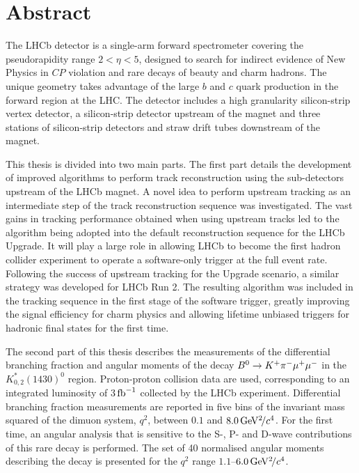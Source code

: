 \section*{Abstract}

The LHCb detector is a single-arm forward spectrometer covering the pseudorapidity range $2 < \eta < 5$, designed to search for indirect evidence of New Physics in $C\!P$ violation and rare decays of beauty and charm hadrons. The unique geometry takes advantage of the large $b$ and $c$ quark production in the forward region at the LHC. The detector includes a high granularity silicon-strip vertex detector, a silicon-strip detector upstream of the magnet and three stations of silicon-strip detectors and straw drift tubes downstream of the magnet.

This thesis is divided into two main parts. The first part details the development of improved algorithms to perform track reconstruction using the sub-detectors upstream of the LHCb magnet. A novel idea to perform upstream tracking as an intermediate step of the track reconstruction sequence was investigated. The vast gains in tracking performance obtained when using upstream tracks led to the algorithm being adopted into the default reconstruction sequence for the LHCb Upgrade. It will play a large role in allowing LHCb to become the first hadron collider experiment to operate a software-only trigger at the full event rate. Following the success of upstream tracking for the Upgrade scenario, a similar strategy was developed for LHCb Run 2. The resulting algorithm was included in the tracking sequence in the first stage of the software trigger, greatly improving the signal efficiency for charm physics and allowing lifetime unbiased triggers for hadronic final states for the first time.

The second part of this thesis describes the measurements of the differential branching fraction and angular moments of the decay ${B}^{0} \rightarrow K^{+}\pi^{-}\mu^{+}\mu^{-}$ in the $K^{*}_{0,2}(1430)^{0}$ region. Proton-proton collision data are used, corresponding to an integrated luminosity of 3$\mbox{\,fb}^{-1}$ collected by the LHCb experiment. Differential branching fraction measurements are reported in five bins of the invariant mass squared of the dimuon system, $q^{2}$, between $0.1$ and $8.0{\mathrm{\,Ge\kern -0.1em V^2\!/}c^4}$. For the first time, an angular analysis that is sensitive to the S-, P- and D-wave contributions of this rare decay is performed. The set of 40 normalised angular moments describing the decay is presented for the $q^{2}$ range $1.1$--$6.0{\mathrm{\,Ge\kern -0.1em V^2\!/}c^4}$. 